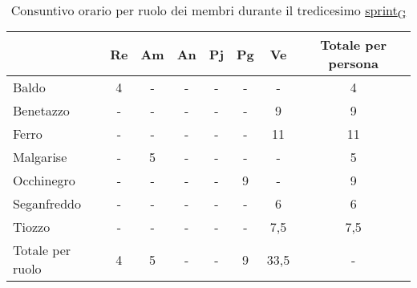\begin{table}[!h]
    \centering
    \begin{tabular}{ | l | c | c | c | c | c | c | c | }
        \hline
        \textbf{} & \textbf{Re} & \textbf{Am} &\textbf{An} & \textbf{Pj} & \textbf{Pg} & \textbf{Ve} & \textbf{Totale per persona} \\
        \hline
        Baldo            &  4   &  -   &  -   &  -   &  -   &  -   &  4   \\
        Benetazzo        &  -   &  -   &  -   &  -   &  -   &  9   &  9   \\
        Ferro            &  -   &  -   &  -   &  -   &  -   & 11   & 11   \\
        Malgarise        &  -   &  5   &  -   &  -   &  -   &  -   &  5   \\
        Occhinegro       &  -   &  -   &  -   &  -   &  9   &  -   &  9   \\
        Seganfreddo      &  -   &  -   &  -   &  -   &  -   &  6   &  6   \\
        Tiozzo           &  -   &  -   &  -   &  -   &  -   &  7,5 &  7,5 \\
        \hline
        Totale per ruolo &  4   &  5   &  -   &  -   &  9   & 33,5 &  -   \\
        \hline
    \end{tabular}
    \caption{Consuntivo orario per ruolo dei membri durante il tredicesimo \href{https://7last.github.io/docs/pb/documentazione-interna/glossario\#sprint}{sprint\textsubscript{G}}}
\end{table}


